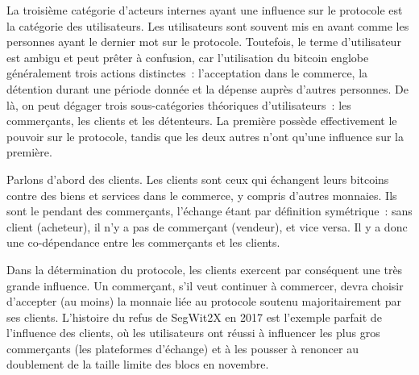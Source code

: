 
La troisième catégorie d'acteurs internes ayant une influence sur le protocole est la catégorie des utilisateurs. Les utilisateurs sont souvent mis en avant comme les personnes ayant le dernier mot sur le protocole. Toutefois, le terme d'utilisateur est ambigu et peut prêter à confusion, car l'utilisation du bitcoin englobe généralement trois actions distinctes~: l'acceptation dans le commerce, la détention durant une période donnée et la dépense auprès d'autres personnes. De là, on peut dégager trois sous-catégories théoriques d'utilisateurs~: les commerçants, les clients et les détenteurs. La première possède effectivement le pouvoir sur le protocole, tandis que les deux autres n'ont qu'une influence sur la première.


Parlons d'abord des clients. Les clients sont ceux qui échangent leurs bitcoins contre des biens et services dans le commerce, y compris d'autres monnaies. Ils sont le pendant des commerçants, l'échange étant par définition symétrique~: sans client (acheteur), il n'y a pas de commerçant (vendeur), et vice versa. Il y a donc une co-dépendance entre les commerçants et les clients. %

Dans la détermination du protocole, les clients exercent par conséquent une très grande influence. Un commerçant, s'il veut continuer à commercer, devra choisir d'accepter (au moins) la monnaie liée au protocole soutenu majoritairement par ses clients. L'histoire du refus de SegWit2X en 2017 est l'exemple parfait de l'influence des clients, où les utilisateurs ont réussi à influencer les plus gros commerçants (les plateformes d'échange) et à les pousser à renoncer au doublement de la taille limite des blocs en novembre.

